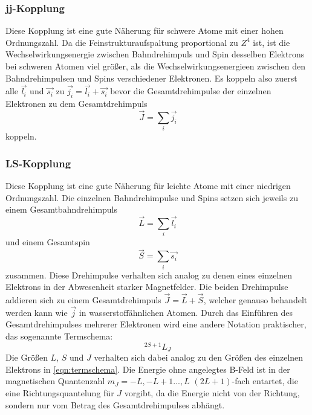         \subsubsection*{jj-Kopplung}
            Diese Kopplung ist eine gute Näherung für schwere Atome mit einer hohen Ordnungszahl.
            Da die Feinstrukturaufspaltung proportional zu $Z^4$ ist, ist die Wechselwirkungsenergie zwischen Bahndrehimpuls und Spin desselben Elektrons bei schweren Atomen viel größer, als die Wechselwirkungsenergieen zwischen den Bahndrehimpulsen und Spins verschiedener Elektronen.
            Es koppeln also zuerst alle $\vec{l_i}$ und $\vec{s_i}$ zu $\vec{j_i} = \vec{l_i} + \vec{s_i}$ bevor die Gesamtdrehimpulse der einzelnen Elektronen zu dem Gesamtdrehimpuls
            \begin{equation}
                \vec{J} = \sum_i \vec{j_i}
            \end{equation}
            koppeln.

        \subsubsection*{LS-Kopplung}
            Diese Kopplung ist eine gute Näherung für leichte Atome mit einer niedrigen Ordnungszahl.
            Die einzelnen Bahndrehimpulse und Spins setzen sich jeweils zu einem Gesamtbahndrehimpuls
            \begin{equation}
                \vec{L} = \sum_i \vec{l_i}
            \end{equation}
            und einem Gesamtspin
            \begin{equation}
                \vec{S} = \sum_i \vec{s_i}
            \end{equation}
            zusammen.
            Diese Drehimpulse verhalten sich analog zu denen eines einzelnen Elektrons in der Abwesenheit starker Magnetfelder.
            Die beiden Drehimpulse addieren sich zu einem Gesamtdrehimpuls $\vec{J} = \vec{L} + \vec{S}$, welcher genauso behandelt werden kann wie $\vec{j}$ in wasserstoffähnlichen Atomen.
            Durch das Einführen des Gesamtdrehimpulses mehrerer Elektronen wird eine andere Notation praktischer, das sogenannte Termschema:
            \begin{equation}
                ^{2S+1}L_J
            \end{equation}
            Die Größen $L$, $S$ und $J$ verhalten sich dabei analog zu den Größen des einzelnen Elektrons in \autoref{eqn:termschema}.
            Die Energie ohne angelegtes B-Feld ist in der magnetischen Quantenzahl $m_J = -L, -L+1 ..., L$ $(2L+1)$-fach entartet, die eine Richtungsquantelung für $J$ vorgibt, da die Energie nicht von der Richtung, sondern nur vom Betrag des Gesamtdrehimpulses abhängt.


